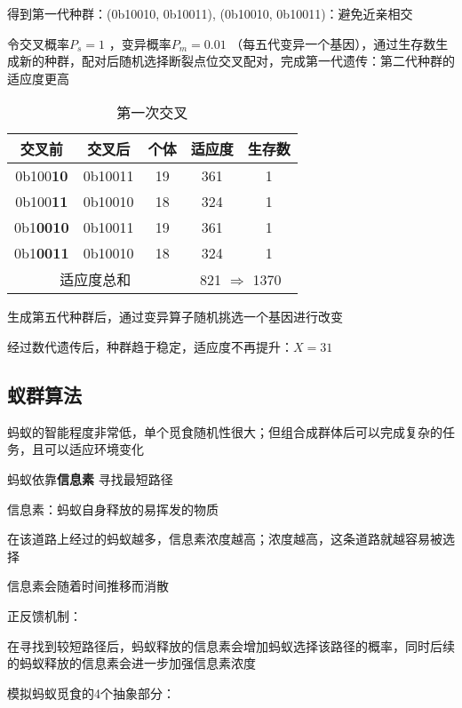 \begin{eg}
    得到第一代种群：(0b10010, 0b10011), (0b10010, 0b10011)：避免近亲相交

    令交叉概率$P_s=1$ ，变异概率$P_m=0.01$ （每五代变异一个基因），通过生存数生成新的种群，配对后随机选择断裂点位交叉配对，完成第一代遗传：第二代种群的适应度更高
    \begin{table}[htpb]
        \centering
        \caption{第一次交叉}
        \label{tab:第一次交叉}
        \begin{tabular}{|c|c|c|c|c|}
        \hline
        交叉前 & 交叉后 & 个体 & 适应度 & 生存数 \\
        \hline
        0b100\textbf{10} & 0b10011 & 19 & 361 & 1 \\
        0b100\textbf{11} & 0b10010 & 18 & 324 & 1 \\
        \hline
        0b1\textbf{0010} & 0b10011 & 19 & 361 & 1 \\
        0b1\textbf{0011} & 0b10010 & 18 & 324 & 1 \\
        \hline
        \multicolumn{3}{|c|}{适应度总和} & \multicolumn{2}{|c|}{821 $\Rightarrow $ 1370}\\
        \hline
        \end{tabular}
    \end{table}

    生成第五代种群后，通过变异算子随机挑选一个基因进行改变

    经过数代遗传后，种群趋于稳定，适应度不再提升：$X=31$
\end{eg}
\subsection{蚁群算法}%
\label{sub:蚁群算法}
\begin{notation}
    蚂蚁的智能程度非常低，单个觅食随机性很大；但组合成群体后可以完成复杂的任务，且可以适应环境变化
\end{notation}
\begin{notation}
    蚂蚁依靠\textbf{信息素} 寻找最短路径

    信息素：蚂蚁自身释放的易挥发的物质

    在该道路上经过的蚂蚁越多，信息素浓度越高；浓度越高，这条道路就越容易被选择

    信息素会随着时间推移而消散
\end{notation}
\begin{notation}
    正反馈机制：
    
    在寻找到较短路径后，蚂蚁释放的信息素会增加蚂蚁选择该路径的概率，同时后续的蚂蚁释放的信息素会进一步加强信息素浓度
\end{notation}
模拟蚂蚁觅食的4个抽象部分：
